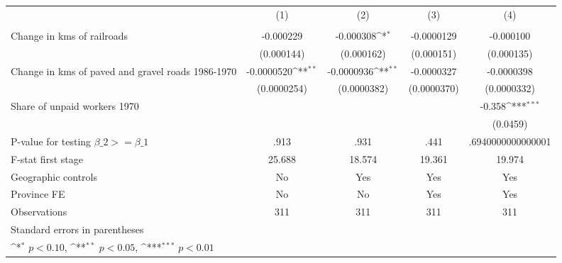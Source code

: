 {
\def\sym#1{\ifmmode^{#1}\else\(^{#1}\)\fi}
\begin{tabular}{l*{4}{c}}
\hline\hline
                &\multicolumn{1}{c}{(1)}&\multicolumn{1}{c}{(2)}&\multicolumn{1}{c}{(3)}&\multicolumn{1}{c}{(4)}\\
                &\multicolumn{1}{c}{}&\multicolumn{1}{c}{}&\multicolumn{1}{c}{}&\multicolumn{1}{c}{}\\
\hline
Change in kms of railroads&-0.000229         &-0.000308\sym{*}  &-0.0000129         &-0.000100         \\
                &(0.000144)         &(0.000162)         &(0.000151)         &(0.000135)         \\
[1em]
Change in kms of paved and gravel roads 1986-1970&-0.0000520\sym{**} &-0.0000936\sym{**} &-0.0000327         &-0.0000398         \\
                &(0.0000254)         &(0.0000382)         &(0.0000370)         &(0.0000332)         \\
[1em]
Share of unpaid workers 1970&                  &                  &                  &   -0.358\sym{***}\\
                &                  &                  &                  & (0.0459)         \\
\hline
P-value for testing $\beta\_{2} >= \beta\_{1}$&     .913         &     .931         &     .441         &.6940000000000001         \\
F-stat first stage&   25.688         &   18.574         &   19.361         &   19.974         \\
Geographic controls&       No         &      Yes         &      Yes         &      Yes         \\
Province FE     &       No         &       No         &      Yes         &      Yes         \\
Observations    &      311         &      311         &      311         &      311         \\
\hline\hline
\multicolumn{5}{l}{\footnotesize Standard errors in parentheses}\\
\multicolumn{5}{l}{\footnotesize \sym{*} \(p<0.10\), \sym{**} \(p<0.05\), \sym{***} \(p<0.01\)}\\
\end{tabular}
}

